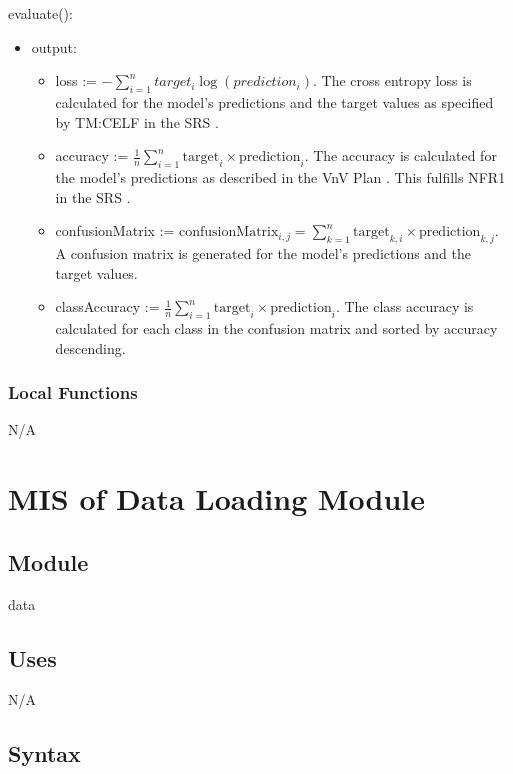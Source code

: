 \documentclass[12pt, titlepage]{article}
\begin{document}
\noindent evaluate():
\begin{itemize}
\item output:
  \begin{itemize}
    \item loss := $- \sum_{i=1}^{n} target_i \log(prediction_i)$. The cross
    entropy loss is calculated for the model's predictions and the target values
    as specified by TM:CELF in the SRS \cite[4.2.2]{SRS}.
    \item accuracy := $\frac{1}{n} \sum_{i=1}^{n} \text{target}_i \times
    \text{prediction}_i$. The accuracy is calculated for the model's predictions
    as described in the VnV Plan \citep{VnV}. This fulfills NFR1 in the SRS \citep{SRS}.
    \item confusionMatrix := $\text{confusionMatrix}_{i,j} = \sum_{k=1}^{n} \text{target}_{k,i} \times \text{prediction}_{k,j}$. A confusion matrix is generated for the model's predictions and the target values.
    \item classAccuracy := $\frac{1}{n} \sum_{i=1}^{n} \text{target}_i \times
    \text{prediction}_i$. The class accuracy is calculated for each class in the
    confusion matrix and sorted by accuracy descending.
  \end{itemize}
\end{itemize}

\subsubsection{Local Functions}

N/A

\newpage
\section{MIS of Data Loading Module} \label{MDataLoading}

\subsection{Module}

data
\subsection{Uses}

N/A

\subsection{Syntax}
\end{document}
